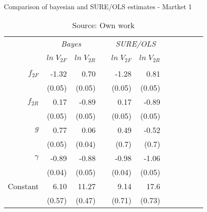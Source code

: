 \begin{table} [H]
\caption{Comparison of bayesian and SURE/OLS estimates - Martket 1}
\label{tbl:mkt1_T}
\centering
\begin{tabular}{rrrrrrrrrrr}
  \toprule 
 & \multicolumn{2}{c}{\textit{Bayes}} & & \multicolumn{2}{c}{\textit{SURE/OLS}} \\ 
\cline{2-3} \cline{5-6}
\\[-1.8ex] & $ln \; V_{2F}$ & $ln \; V_{2R}$ & & $ln \; V_{2F}$ & $ln \; V_{2R}$ \\ 
\hline \\[-1.8ex] 

  $f_{2F}$ & -1.32 & 0.70 & &-1.28 & 0.81\\
  		   & (0.05)  & (0.05) & & (0.05) & (0.05)\\ [0.2cm]
  $f_{2R}$ & 0.17 & -0.89  & & 0.17 & -0.89 \\
  			& (0.05) &  (0.05) & & (0.05) & (0.05)\\ [0.2cm]
  $g$ & 0.77 & 0.06 & & 0.49 & \cellcolor{gray!25}-0.52 \\
  		& (0.05) & (0.04) & & (0.7) & (0.7)\\ [0.2cm]
  $\gamma$ & -0.89 & -0.88 & & -0.98 & -1.06\\
  			& (0.04) & (0.05) & & (0.04) & (0.05)\\ [0.2cm]
  Constant & 6.10 & 11.27 & & 9.14 & 17.6\\
  			& (0.57) & (0.47) & & (0.71) & (0.73)\\ [0.2cm]
\bottomrule
\end{tabular}
\caption*{Source: Own work}
\end{table}
